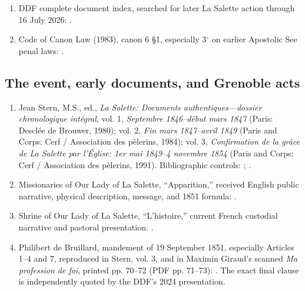 \begin{enumerate}
  \item DDF complete document index, searched for later La Salette action through 16 July 2026: .
  \item Code of Canon Law (1983), canon 6 \S1, especially 3$^\circ$ on earlier Apostolic See penal laws: .
\end{enumerate}

\subsection{The event, early documents, and Grenoble acts}

\begin{enumerate}
  \item Jean Stern, M.S., ed., \emph{La Salette: Documents authentiques---dossier chronologique intégral}, vol. 1, \emph{Septembre 1846--début mars 1847} (Paris: Desclée de Brouwer, 1980); vol. 2, \emph{Fin mars 1847--avril 1849} (Paris and Corps: Cerf / Association des pèlerins, 1984); vol. 3, \emph{Confirmation de la grâce de La Salette par l'Église: 1er mai 1849--4 novembre 1854} (Paris and Corps: Cerf / Association des pèlerins, 1991). Bibliographic controls: ; .
  \item Missionaries of Our Lady of La Salette, ``Apparition,'' received English public narrative, physical description, message, and 1851 formula: .
  \item Shrine of Our Lady of La Salette, ``L'histoire,'' current French custodial narrative and pastoral presentation: .
  \item Philibert de Bruillard, mandement of 19 September 1851, especially Articles 1--4 and 7, reproduced in Stern, vol. 3, and in Maximin Giraud's scanned \emph{Ma profession de foi}, printed pp. 70--72 (PDF pp. 71--73): . The exact final clause is independently quoted by the DDF's 2024 presentation.

\end{enumerate}
